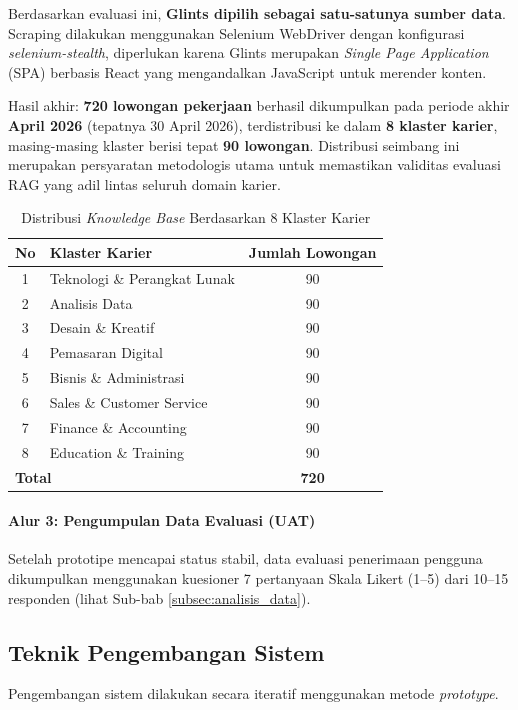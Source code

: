 Berdasarkan evaluasi ini, \textbf{Glints dipilih sebagai satu-satunya sumber data}.
Scraping dilakukan menggunakan Selenium WebDriver dengan konfigurasi \textit{selenium-stealth},
diperlukan karena Glints merupakan \textit{Single Page Application} (SPA) berbasis React
yang mengandalkan JavaScript untuk merender konten.

Hasil akhir: \textbf{720 lowongan pekerjaan} berhasil dikumpulkan pada periode akhir \textbf{April 2026} (tepatnya 30 April 2026), terdistribusi ke dalam \textbf{8 klaster karier},
masing-masing klaster berisi tepat \textbf{90 lowongan}. Distribusi seimbang ini merupakan
persyaratan metodologis utama untuk memastikan validitas evaluasi RAG yang adil lintas
seluruh domain karier.

\begin{table}[H]
\centering
\caption{Distribusi \textit{Knowledge Base} Berdasarkan 8 Klaster Karier}
\label{tab:klaster}
\begin{tabular}{clc}
\toprule
\textbf{No} & \textbf{Klaster Karier} & \textbf{Jumlah Lowongan} \\
\midrule
1 & Teknologi \& Perangkat Lunak & 90 \\
2 & Analisis Data & 90 \\
3 & Desain \& Kreatif & 90 \\
4 & Pemasaran Digital & 90 \\
5 & Bisnis \& Administrasi & 90 \\
6 & Sales \& Customer Service & 90 \\
7 & Finance \& Accounting & 90 \\
8 & Education \& Training & 90 \\
\midrule
\multicolumn{2}{l}{\textbf{Total}} & \textbf{720} \\
\bottomrule
\end{tabular}
\end{table}

\paragraph{Alur 3: Pengumpulan Data Evaluasi (UAT)}
Setelah prototipe mencapai status stabil, data evaluasi penerimaan pengguna dikumpulkan
menggunakan kuesioner 7 pertanyaan Skala Likert (1--5) dari 10--15 responden (lihat
Sub-bab \ref{subsec:analisis_data}).

\subsection{Teknik Pengembangan Sistem}
Pengembangan sistem dilakukan secara iteratif menggunakan metode \textit{prototype}.

